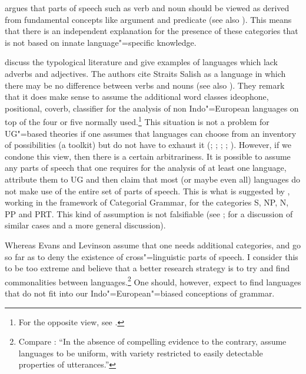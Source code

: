 \citet[]{Braine87a} argues that parts of speech such as verb and noun should be viewed as derived from fundamental concepts like argument and predicate
(see also ). This means that there is an independent explanation for the presence of these categories that is not
based on innate language"=specific knowledge.

\citet[Section~2.2.4]{EL2009a} discuss the typological literature and give examples of languages which lack adverbs and adjectives.
The authors cite Straits Salish as a language in which there may be no difference
between verbs and nouns (see also \citealp[]{EL2009b}).
They remark that it does make sense to assume the additional word classes ideophone, positional, coverb,
classifier for the analysis of non Indo"=European languages on top of the four or five normally used.\footnote{
	For the opposite view, see .
} 
This situation is not a problem for UG"=based theories if one assumes that languages can choose from an inventory of possibilities (a toolkit)
but do not have to exhaust it (\citealp[]{Jackendoff2002a-u}; \citealp[]{Newmeyer2005a}; \citealp*[]{FHC2005a};
\citealp[--7]{Chomsky2007a}; \citealp[, 58, 65]{CR2010a}). 
However, if we condone this view, then there is a certain arbitrariness. It is possible to assume any parts of speech that one requires
for the analysis of at least one language, attribute them to UG and then claim that most (or maybe even all) languages do not make use of
the entire set of parts of speech. This is what is suggested by \citet[]{Villavicencio2002a}, working in the framework
of Categorial Grammar, for the categories S, NP, N, PP and PRT. This kind of assumption is not falsifiable (see
\citealp[]{EL2009a}; \citealp[]{Tomasello2009a} for a discussion of similar cases and a more general discussion).

Whereas Evans and Levinson assume that one needs additional categories, \citet[]{Haspelmath2009a} and \citet[]{Croft2009a} go so far as to deny the existence of cross"=linguistic
parts of speech. I consider this to be too extreme and believe that a better research strategy is to try and find commonalities between
languages.\footnote{
  Compare :
``In the absence of compelling evidence to the contrary, assume languages to be uniform, with variety
restricted to easily detectable properties of utterances.''
} 
One should, however, expect to find languages that do not fit into our Indo"=European"=biased conceptions of grammar.

